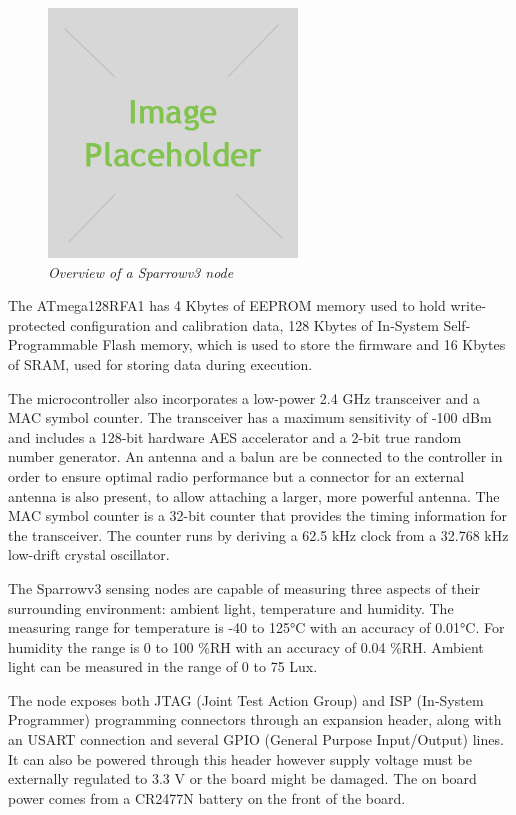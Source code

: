 \begin{figure}[ht]
	\begin{center}
		\includegraphics{img/placeholder.jpg}
	\end{center}
	\caption{\small \itshape{Overview of a Sparrowv3 node}}
\end{figure}

The \mbox{ATmega128RFA1} has 4 Kbytes of EEPROM memory used to hold
write-protected configuration and calibration data, 128 Kbytes of In-System
Self-Programmable Flash memory, which is used to store the firmware and 16 
Kbytes of SRAM, used for storing data during execution.

The microcontroller also incorporates a low-power 2.4 GHz transceiver and a MAC
symbol counter. The transceiver has a maximum sensitivity of -100 dBm and
includes a 128-bit hardware AES accelerator and a 2-bit true random number
generator. An antenna and a balun are be connected to the controller in 
order to ensure optimal radio performance but a connector for an external 
antenna is also present, to allow attaching a larger, more powerful
antenna. The MAC symbol counter is a 32-bit counter that provides the timing 
information for the transceiver. The counter runs by deriving a 62.5 kHz clock 
from a 32.768 kHz low-drift crystal oscillator. 

The Sparrowv3 sensing nodes are capable of measuring three aspects of their
surrounding environment: ambient light, temperature and humidity. The measuring
range for temperature is -40 to 125°C with an accuracy of 0.01°C. For humidity
the range is 0 to 100 \%RH with an accuracy of 0.04 \%RH. Ambient light can be
measured in the range of 0 to 75 Lux.

The node exposes both JTAG (Joint Test Action Group) and ISP (In-System
Programmer) programming connectors through an expansion
header, along with an USART connection and several GPIO (General Purpose
Input/Output) lines. It can also be powered through this header however supply
voltage must be externally regulated to 3.3 V or the board might be damaged.
The on board power comes from a CR2477N battery on the front of the board.

